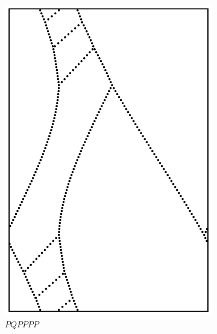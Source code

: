 \documentclass[12pt,twoside]{reedthesis}
\theoremstyle{definition}
\begin{document}
\begin{figure}[b!]
\begin{subfigure}[t]{0.24\textwidth}
    \includegraphics[width=\textwidth]{figures/string_cheese_appendix/pqpppp.pdf}
    \caption*{$PQPPPP$}
    \vspace{5mm}
  \end{subfigure}
  \hfill
  \begin{subfigure}[t]{0.24\textwidth}

\end{subfigure}
\end{figure}
\end{document}
